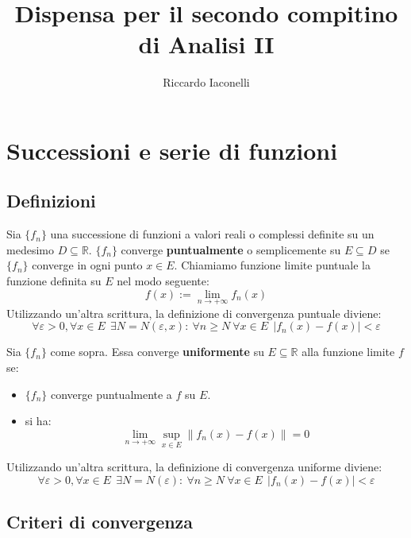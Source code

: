 \documentclass[a4paper,12pt]{article}
\begin{document}
\begin{titlepage}
\title{Dispensa per il secondo compitino di Analisi II}
\author{Riccardo Iaconelli}
\maketitle
\end{titlepage}

\begin{titlepage}
\tableofcontents
\end{titlepage}

\section{Successioni e serie di funzioni}
\subsection{Definizioni}


Sia $\{ f_n\} $  una successione di funzioni a valori reali o complessi definite su un medesimo $D \subseteq \mathbb{R}$.
 $\{ f_n\} $ converge \textbf{puntualmente} o semplicemente su $ E \subseteq D $ se $\{f_n\}$ converge in ogni punto $x \in E.$ Chiamiamo funzione limite puntuale la funzione definita su $E$ nel modo seguente: 
 $$f(x):=\lim_{n\to+\infty} f_n(x)$$
Utilizzando un'altra scrittura, la definizione di convergenza puntuale diviene:
 $$\forall \varepsilon>0, \forall x \in E\ \ \exists N=N(\varepsilon, x):\ \forall n \geq N\ \forall x\in E\ \ |f_n(x) - f(x)| < \varepsilon$$ 
 
 Sia $\{ f_n\} $ come sopra. Essa converge \textbf{uniformente} su $E \subseteq \mathbb{R} $ alla funzione limite $f$ se:
 \begin{itemize}
 \item $\{ f_n\} $ converge puntualmente a $f$ su $E$.
 \item si ha:
 $$ \lim_{n\to+\infty} \displaystyle \sup_{x \in E} \|f_n\left(x\right)-f\left(x\right)\| = 0$$
 \end{itemize}

Utilizzando un'altra scrittura, la definizione di convergenza uniforme diviene:
 $$\forall \varepsilon>0, \forall x \in E\ \ \exists N=N(\varepsilon):\ \forall n \geq N\ \forall x\in E\ \ |f_n(x) - f(x)| < \varepsilon$$ 
\subsection{Criteri di convergenza}
\end{document}
